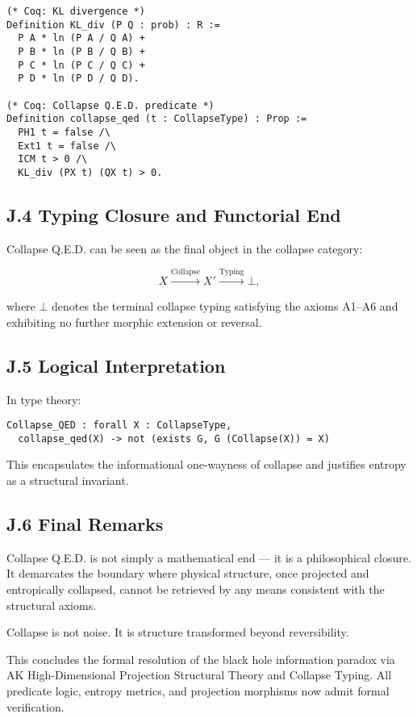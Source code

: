 \documentclass[11pt]{article}
\begin{document}
\begin{lstlisting}
(* Coq: KL divergence *)
Definition KL_div (P Q : prob) : R :=
  P A * ln (P A / Q A) +
  P B * ln (P B / Q B) +
  P C * ln (P C / Q C) +
  P D * ln (P D / Q D).

(* Coq: Collapse Q.E.D. predicate *)
Definition collapse_qed (t : CollapseType) : Prop :=
  PH1 t = false /\
  Ext1 t = false /\
  ICM t > 0 /\
  KL_div (PX t) (QX t) > 0.
\end{lstlisting}

\subsection*{J.4 Typing Closure and Functorial End}

Collapse Q.E.D. can be seen as the final object in the collapse category:

\[
X \xrightarrow{\mathrm{Collapse}} X' \xrightarrow{\mathrm{Typing}} \bot,
\]

where \( \bot \) denotes the terminal collapse typing satisfying the axioms A1–A6 and exhibiting no further morphic extension or reversal.

\subsection*{J.5 Logical Interpretation}

In type theory:

\begin{lstlisting}
Collapse_QED : forall X : CollapseType,
  collapse_qed(X) -> not (exists G, G (Collapse(X)) = X)
\end{lstlisting}

This encapsulates the informational one-wayness of collapse and justifies entropy as a structural invariant.

\subsection*{J.6 Final Remarks}

Collapse Q.E.D. is not simply a mathematical end — it is a philosophical closure. It demarcates the boundary where physical structure, once projected and entropically collapsed, cannot be retrieved by any means consistent with the structural axioms.

Collapse is not noise. It is structure transformed beyond reversibility.

This concludes the formal resolution of the black hole information paradox via AK High-Dimensional Projection Structural Theory and Collapse Typing. All predicate logic, entropy metrics, and projection morphisms now admit formal verification.
\end{document}
